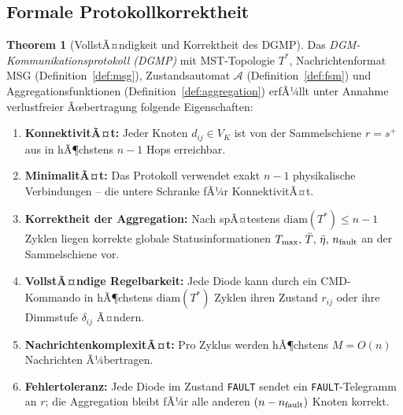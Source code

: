 ﻿\documentclass[a4paper,12pt]{article}
\theoremstyle{definition}
\newtheorem{theorem}[definition]{Theorem}
\theoremstyle{remark}
\begin{document}
\subsection{Formale Protokollkorrektheit}
\label{sec:komm_beweis}

\begin{theorem}[VollstÃ¤ndigkeit und Korrektheit des DGMP]
\label{thm:dgmp}
Das \emph{DGM-Kommunika\-tionsprotokoll (DGMP)} mit MST-Topologie $T^*$,
Nachrichtenformat MSG (Definition~\ref{def:msg}), Zustandsautomat
$\mathcal{A}$ (Definition~\ref{def:fsm}) und Aggregationsfunktionen
(Definition~\ref{def:aggregation}) erfÃ¼llt unter Annahme
verlustfreier Ãœbertragung folgende Eigenschaften:
\begin{enumerate}[label=(P\arabic*)]
  \item \textbf{KonnektivitÃ¤t:} Jeder Knoten $d_{ij} \in V_K$ ist von der
    Sammelschiene $r = s^+$ aus in hÃ¶chstens $n-1$ Hops erreichbar.
  \item \textbf{MinimalitÃ¤t:} Das Protokoll verwendet exakt $n-1$
    physikalische Verbindungen -- die untere Schranke fÃ¼r KonnektivitÃ¤t.
  \item \textbf{Korrektheit der Aggregation:} Nach spÃ¤testens
    $\mathrm{diam}(T^*) \leq n-1$ Zyklen liegen korrekte globale Statusinformationen
    $T_{\max},\, \bar{T},\, \bar{\eta},\, n_{\rm fault}$ an der Sammelschiene vor.
  \item \textbf{VollstÃ¤ndige Regelbarkeit:} Jede Diode kann durch ein
    CMD-Kommando in hÃ¶chstens $\mathrm{diam}(T^*)$ Zyklen ihren Zustand
    $r_{ij}$ oder ihre Dimmstufe $\delta_{ij}$ Ã¤ndern.
  \item \textbf{NachrichtenkomplexitÃ¤t:} Pro Zyklus werden hÃ¶chstens
    $M = O(n)$ Nachrichten Ã¼bertragen.
  \item \textbf{Fehlertoleranz:} Jede Diode im Zustand \texttt{FAULT}
    sendet ein \texttt{FAULT}-Telegramm an $r$; die Aggregation bleibt
    fÃ¼r alle anderen $(n - n_{\rm fault})$ Knoten korrekt.
\end{enumerate}
\end{theorem}
\end{document}
